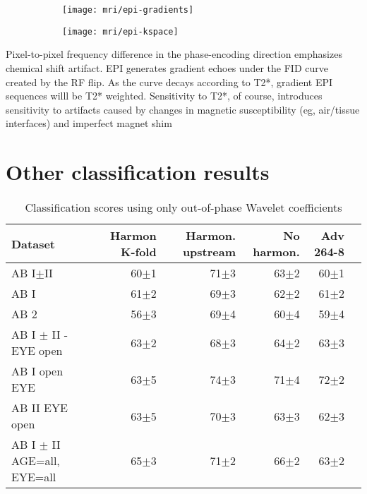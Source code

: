 \documentclass[a4paper,11pt]{article}
\begin{document}
\begin{figure}
\begin{subfigure}{0.5\textwidth}
\texttt{[image: mri/epi-gradients]}
\caption{}
\label{fig:epi-gradients}
\end{subfigure}
\begin{subfigure}{0.5\textwidth}
\texttt{[image: mri/epi-kspace]}
\caption{}
\label{}
\end{subfigure}
\caption{}
\label{fig:epi}
\end{figure}


Pixel-to-pixel frequency difference in the phase-encoding direction emphasizes chemical shift artifact.
EPI generates gradient echoes under the FID curve created by the RF flip. As the curve decays according to T2*, gradient EPI sequences willl be T2* weighted.
Sensitivity to T2*, of course, introduces sensitivity to artifacts caused by changes in magnetic susceptibility (eg, air/tissue interfaces) and imperfect magnet shim

\section{Other classification results}

\begin{table}[!htp]\centering
\scriptsize
\begin{tabular}{lrrrrr}\toprule
Dataset &Harmon K-fold &Harmon. upstream &No harmon. &Adv 264-8 \\\midrule
AB I$\pm$II &60$\pm$1 &71$\pm$3 &63$\pm$2 &60$\pm$1 \\
AB I &61$\pm$2 &69$\pm$3 &62$\pm$2 &61$\pm$2 \\
AB 2 &56$\pm$3 &69$\pm$4 &60$\pm$4 &59$\pm$4 \\
AB I $\pm$ II - EYE open &63$\pm$2 &68$\pm$3 &64$\pm$2 &63$\pm$3 \\
AB I open EYE &63$\pm$5 &74$\pm$3 &71$\pm$4 &72$\pm$2 \\
AB II EYE open &63$\pm$5 &70$\pm$3 &63$\pm$3 &62$\pm$3 \\
AB I $\pm$ II AGE=all, EYE=all &65$\pm$3 &71$\pm$2 &66$\pm$2 &63$\pm$2 \\
\bottomrule
\end{tabular}
\caption{Classification scores using only out-of-phase Wavelet coefficients}\label{}
\end{table}




\end{document}
